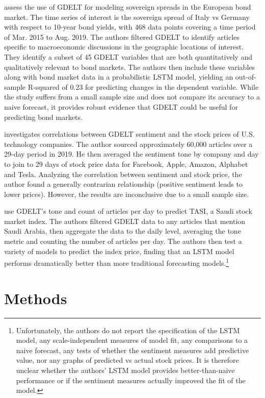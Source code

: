 \documentclass[12pt]{article}
\begin{document}
\textcite{consoli2021information} assess the use of GDELT for modeling sovereign spreads in the European bond market. The time series of interest is the sovereign spread of Italy vs Germany with respect to 10-year bond yields, with 468 data points covering a time period of Mar. 2015 to Aug. 2019. The authors filtered GDELT to identify articles specific to macroeconomic discussions in the geographic locations of interest. They identify a subset of 45 GDELT variables that are both quantitatively and qualitatively relevant to bond markets. The authors then include these variables along with bond market data in a probabilistic LSTM model, yielding an out-of-sample R-squared of 0.23 for predicting changes in the dependent variable. While the study suffers from a small sample size and does not compare its accuracy to a naive forecast, it provides robust evidence that GDELT could be useful for predicting bond markets.

\textcite{jakel2019using} investigates correlations between GDELT sentiment and the stock prices of U.S. technology companies. The author sourced approximately 60,000 articles over a 29-day period in 2019. He then averaged the sentiment tone by company and day to join to 29 days of stock price data for Facebook, Apple, Amazon, Alphabet and Tesla. Analyzing the correlation between sentiment and stock price, the author found a generally contrarian relationship (positive sentiment leads to lower prices). However, the results are inconclusive due to a small sample size.

\textcite{alamro2019predicting} use GDELT's tone and count of articles per day to predict TASI, a Saudi stock market index. The authors filtered GDELT data to any articles that mention Saudi Arabia, then aggregate the data to the daily level, averaging the tone metric and counting the number of articles per day. The authors then test a variety of models to predict the index price, finding that an LSTM model performs dramatically better than more traditional forecasting models.\footnote{Unfortunately, the authors do not report the specification of the LSTM model, any scale-independent measures of model fit, any comparisons to a naive forecast, any tests of whether the sentiment measures add predictive value, nor any graphs of predicted vs actual stock prices. It is therefore unclear whether the authors' LSTM model provides better-than-naive performance or if the sentiment measures actually improved the fit of the model.}

\section{Methods}
\label{section:methods}
\end{document}

